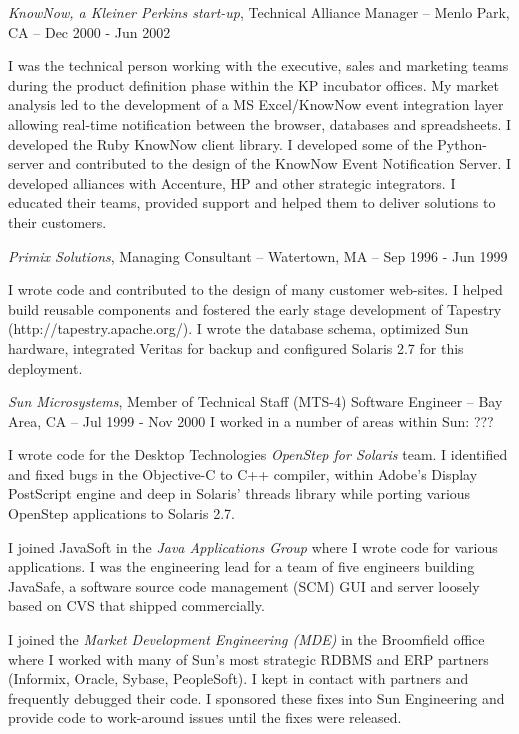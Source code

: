 \documentclass[letterpaper]{article}
\renewenvironment{itemize}{
  \begin{list}{}{
    \setlength{\leftmargin}{1.5em}
  }
}{
  \end{list}
}
\begin{document}
\begin{itemize}
\item {\it KnowNow, a Kleiner Perkins start-up}, Technical Alliance Manager -- Menlo Park, CA -- Dec 2000 - Jun 2002

\begin{itemize}
\item I was the technical person working with the executive, sales and
  marketing teams during the product definition phase within the KP incubator
  offices. My market analysis led to the development of a MS Excel/KnowNow
  event integration layer allowing real-time notification between the browser,
  databases and spreadsheets.  I developed the Ruby KnowNow client library.  I
  developed some of the Python-server and contributed to the design of the
  KnowNow Event Notification Server.  I developed alliances with Accenture, HP
  and other strategic integrators.  I educated their teams, provided support
  and helped them to deliver solutions to their customers.
\end{itemize}

\item {\it Primix Solutions}, Managing Consultant -- Watertown, MA -- Sep 1996 - Jun 1999

\begin{itemize}
\item I wrote code and contributed to the design of many customer web-sites.  I
  helped build reusable components and fostered the early stage development of
  Tapestry (http://tapestry.apache.org/).  I wrote the database schema,
  optimized Sun hardware, integrated Veritas for backup and configured Solaris
  2.7 for this deployment.
\end{itemize}

\item {\it Sun Microsystems}, Member of Technical Staff (MTS-4) Software Engineer -- Bay Area, CA -- Jul 1999 - Nov 2000
I worked in a number of areas within Sun: ???
\begin{itemize}
\item I wrote code for the Desktop Technologies {\it OpenStep for Solaris}
  team.  I identified and fixed bugs in the Objective-C to C++ compiler, within
  Adobe's Display PostScript engine and deep in Solaris' threads library while
  porting various OpenStep applications to Solaris 2.7.
\item I joined JavaSoft in the {\it Java Applications Group} where I wrote code
  for various applications.  I was the engineering lead for a team of five
  engineers building JavaSafe, a software source code management (SCM) GUI and
  server loosely based on CVS that shipped commercially.
\item I joined the {\it Market Development Engineering (MDE)} in the Broomfield
  office where I worked with many of Sun's most strategic RDBMS and ERP
  partners (Informix, Oracle, Sybase, PeopleSoft).  I kept in contact with
  partners and frequently debugged their code.  I sponsored these fixes into
  Sun Engineering and provide code to work-around issues until the fixes were
  released.
\end{itemize}


\end{itemize}
\end{document}
